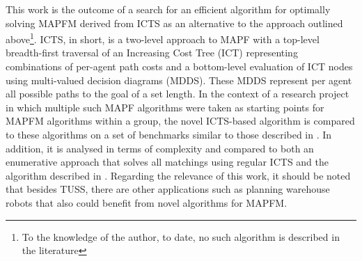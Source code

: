 \documentclass[english]{article}
\begin{document}
	This work is the outcome of a search for an efficient algorithm for optimally solving MAPFM derived from ICTS as an alternative to the approach outlined above\footnote{To the knowledge of the author, to date, no such algorithm is described in the literature}. ICTS, in short, is a two-level approach to MAPF with a top-level breadth-first traversal of an Increasing Cost Tree (ICT) representing combinations of per-agent path costs and a bottom-level evaluation of ICT nodes using multi-valued decision diagrams (MDDS). These MDDS represent per agent all possible paths to the goal of a set length. In the context of a research project in which multiple such 
	MAPF algorithms were taken as starting points for MAPFM algorithms within a group, the novel ICTS-based algorithm is compared to these algorithms on a set of benchmarks similar to those described in \cite{stern2019}. In addition, it is analysed in terms of complexity and compared to both an enumerative approach that solves all matchings using regular ICTS and the algorithm described in \cite{ma2016}. Regarding the relevance of this work, it should be noted that besides TUSS, there are other applications such as planning warehouse robots \cite{wurman2007} that also could benefit from novel algorithms for MAPFM.
	
\end{document}
